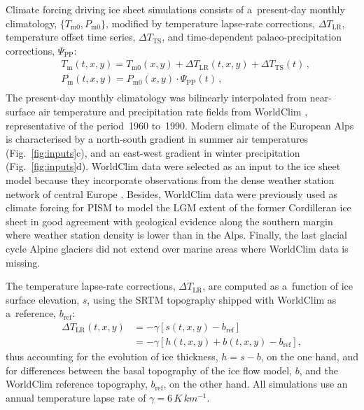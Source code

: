 \documentclass[tc, manuscript]{copernicus}
\begin{document}
    Climate forcing driving ice sheet simulations consists of a~present-day
    monthly climatology, $\{T_{\mathrm{m}0}, P_{\mathrm{m}0}\}$, modified by
    temperature lapse-rate corrections, ${\Delta}T_{\text{LR}}$, temperature
    offset time series, ${\Delta}T_{\text{TS}}$, and time-dependent
    palaeo-precipitation corrections, $\Psi_{\text{PP}}$:
    \begin{align}
      &T_{\mathrm{m}}(t, x, y) = T_{\mathrm{m}0}(x, y) +
                                 {\Delta}T_{\text{LR}}(t, x, y) +
                                 {\Delta}T_{\text{TS}}(t) \,, \\
      &P_{\mathrm{m}}(t, x, y) = P_{\mathrm{m}0}(x, y) \cdot
                                 {\Psi}_{\text{PP}}(t) \,, \\
    \end{align}
    The present-day monthly climatology was bilinearly interpolated from
    near-surface air temperature and precipitation rate fields from
    WorldClim \citep{Hijmans.etal.2005}, representative of the period~1960
    to~1990. Modern climate of the European Alps is characterised by a
    north-south gradient in summer air temperatures (Fig.~\ref{fig:inputs}c),
    and an east-west gradient in winter precipitation (Fig.~\ref{fig:inputs}d).
    WorldClim data
    were selected as an input to the ice sheet model because they incorporate
    observations from the dense weather station network of central Europe
    \citep[Fig.~1]{Hijmans.etal.2005}. Besides, WorldClim data were
    previously used as climate forcing for PISM to model the LGM extent of the
    former Cordilleran ice sheet in good agreement with geological evidence
    along the southern margin \citep{Seguinot.etal.2014} where weather station
    density is lower than in the Alps. Finally, the last glacial cycle Alpine
    glaciers did not extend over marine areas where WorldClim data is missing.

    The temperature lapse-rate corrections, ${\Delta}T_{\text{LR}}$, are
    computed as a~function of ice surface elevation, $s$, using the SRTM
    topography shipped with WorldClim as a~reference, $b_{\text{ref}}$:
    \begin{align}
      {\Delta}T_{\text{LR}}(t, x, y) &= -\gamma [s(t, x, y)-b_{\text{ref}}] \\
                                     &= -\gamma [h(t, x, y)+
                                                 b(t, x, y)-b_{\text{ref}}],
    \end{align}
    thus accounting for the evolution of ice thickness, ${h=s-b}$, on the one
    hand, and for differences between the basal topography of the ice flow
    model, $b$, and the WorldClim reference topography, $b_{\text{ref}}$, on
    the other hand. All simulations use an annual temperature lapse rate of
    $\gamma=6\,\unit{K\,km^{-1}}$.
\end{document}
